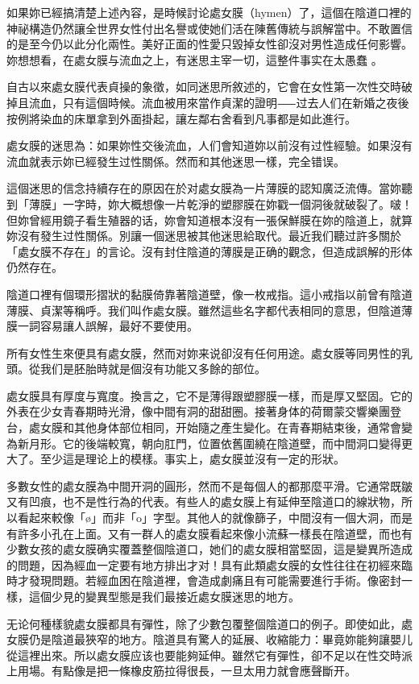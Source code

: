 \documentclass[12pt,UTF8]{ctexbook}
\begin{document}
如果妳已經搞清楚上述內容，是時候討论處女膜（hymen）了，這個在陰道口裡的神祕構造仍然讓全世界女性付出名譽或使她们活在陳舊傳統与誤解當中。不敢置信的是至今仍以此分化兩性。美好正面的性愛只毀掉女性卻沒对男性造成任何影響。妳想想看，在處女膜与流血之上，有迷思主宰一切，這整件事实在太愚蠢 。

自古以來處女膜代表貞操的象徵，如同迷思所敘述的，它會在女性第一次性交時破掉且流血，只有這個時候。流血被用來當作貞潔的證明⸺过去人们在新婚之夜後按例將染血的床單拿到外面掛起，讓左鄰右舍看到凡事都是如此進行。

處女膜的迷思為：如果妳性交後流血，人们會知道妳以前沒有过性經驗。如果沒有流血就表示妳已經發生过性關係。然而和其他迷思一樣，完全错误。

這個迷思的信念持續存在的原因在於对處女膜為一片薄膜的認知廣泛流傳。當妳聽到「薄膜」一字時，妳大概想像一片乾淨的塑膠膜在妳戳一個洞後就破裂了。啵！但妳曾經用鏡子看生殖器的话，妳會知道根本沒有一張保鮮膜在妳的陰道上，就算妳沒有發生过性關係。別讓一個迷思被其他迷思給取代。最近我们聽过許多關於「處女膜不存在」的言论。沒有封住陰道的薄膜是正确的觀念，但造成誤解的形体仍然存在。

陰道口裡有個環形摺狀的黏膜倚靠著陰道壁，像一枚戒指。這小戒指以前曾有陰道薄膜、貞潔等稱呼。我们叫作處女膜。雖然這些名字都代表相同的意思，但陰道薄膜一詞容易讓人誤解，最好不要使用。

所有女性生來便具有處女膜，然而对妳来说卻沒有任何用途。處女膜等同男性的乳頭。從我们是胚胎時就是個沒有功能又多餘的部位。

處女膜具有厚度与寬度。換言之，它不是薄得跟塑膠膜一樣，而是厚又堅固。它的外表在少女青春期時光滑，像中間有洞的甜甜圈。接著身体的荷爾蒙交響樂團登台，處女膜和其他身体部位相同，开始隨之產生變化。在青春期結束後，通常會變為新月形。它的後端較寬，朝向肛門，位置依舊圍繞在陰道壁，而中間洞口變得更大了。至少這是理论上的模樣。事实上，處女膜並沒有一定的形狀。

多數女性的處女膜為中間开洞的圓形，然而不是每個人的都那麼平滑。它通常既皺又有凹痕，也不是性行為的代表。有些人的處女膜上有延伸至陰道口的線狀物，所以看起來較像「ø」而非「o」字型。其他人的就像篩子，中間沒有一個大洞，而是有許多小孔在上面。又有一群人的處女膜看起來像小流蘇一樣長在陰道壁，而也有少數女孩的處女膜确实覆蓋整個陰道口，她们的處女膜相當堅固，這是變異所造成的問題，因為經血一定要有地方排出才对！具有此類處女膜的女性往往在初經來臨時才發現問題。若經血困在陰道裡，會造成劇痛且有可能需要進行手術。像密封一樣，這個少見的變異型態是我们最接近處女膜迷思的地方。

无论何種樣貌處女膜都具有彈性，除了少數包覆整個陰道口的例子。即使如此，處女膜仍是陰道最狹窄的地方。陰道具有驚人的延展、收縮能力：畢竟妳能夠讓嬰儿從這裡出來。所以處女膜应该也要能夠延伸。雖然它有彈性，卻不足以在性交時派上用場。有點像是把一條橡皮筋拉得很長，一旦太用力就會應聲斷开。
\end{document}
